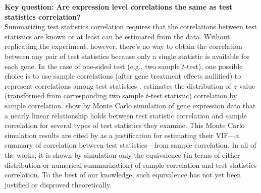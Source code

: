\documentclass[12pt, a4paper]{article}
\begin{document}
	\textbf{Key question: Are  expression level correlations the same as test statistics correlation?}\\
	Summarizing test statistics correlation requires that the correlations between test statistics 
	are known or at least can be estimated from the data. Without 
	replicating the experiment, however, there's no way to obtain the correlation between any pair 
	of test statistics because only a single  statistic is available for each gene. In the case of 
	one-sided test (e.g., two sample $t$-test), one possible choice is to use sample 
	correlations (after gene treatment effects nullified) to represent correlations among test 
	statistics \citep{barry2008statistical, efron2007correlation, wu2012camera, 
	yaari2013quantitative}. 
	\citet{efron2007correlation} estimates the distribution of $z$-value (transformed from 
	corresponding two sample $t$-test statistic) 
	correlation by sample correlation. \citet{barry2008statistical} show by Monte Carlo simulation of gene expression data that a nearly linear 
	relationship holds between test statistic correlation and sample correlation for several types 
	of test statistics they examine.  This Monte Carlo simulation results are cited by 
	\citet{wu2012camera} as a justification for estimating their VIF---a summary of correlation 
	between test statistics---from sample correlation.
	 In all of the 
	works, it is shown by simulation only the 
	equivalence (in terms of either distribution or numerical summarization) of sample correlation  
	and test statistics	correlation. 
	 To the best of our knowledge, such equivalence has not yet been justified or disproved 
	 theoretically.
	
\end{document}
